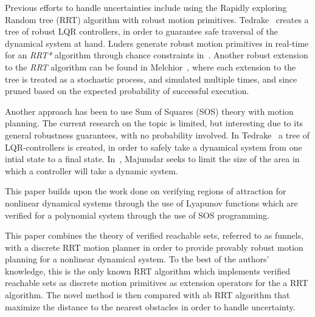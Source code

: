 Previous efforts to handle uncertainties include using
the Rapidly exploring Random tree (RRT) algorithm with robust motion
primitives. Tedrake~\cite{tedrakeLQRtreesFeedbackMotion2009} creates a tree of
robust LQR controllers, in order to guarantee safe traversal of the dynamical
system at hand. Luders generate robust motion primitives in real-time for an
\textit{RRT*} algorithm through chance constraints in~\cite{luders2013robust}.
Another robust extension to the \textit{RRT} algorithm can be found in
Melchior~\cite{melchior2007particle}, where each extension to the tree is
treated as a stochastic process, and simulated multiple times, and since pruned
based on the expected probability of successful execution.



Another approach has been to use 
Sum of Squares (SOS) theory with motion
planning. The current research on the topic is limited, but interesting due to its general robustness
guarantees, with no probability involved. In
Tedrake~\cite{tedrakeLQRtreesFeedbackMotion2009} a tree of LQR-controllers is
created, in order to safely take a dynamical system from one intial state to a
final state. In~\cite{majumdarFunnelLibrariesRealtime2017}, Majumdar seeks to
limit the size of the area in which a controller will take a dynamic system.


This paper builds upon the work done on verifying regions of attraction for
nonlinear dynamical systems through the use of Lyapunov functions which are
verified for a polynomial system through the use of SOS programming.


This paper combines the theory of verified reachable sets, referred to as
funnels, with a discrete RRT motion planner in order to provide provably robust
motion planning for a nonlinear dynamical system. To the best of the authors'
knowledge, this is the only known RRT algorithm which implements verified
reachable sets as discrete motion primitives as extension operators for the a
RRT algorithm. The novel method is then compared with ab RRT algorithm that maximize the distance to the nearest obstacles in order to handle uncertainty.

